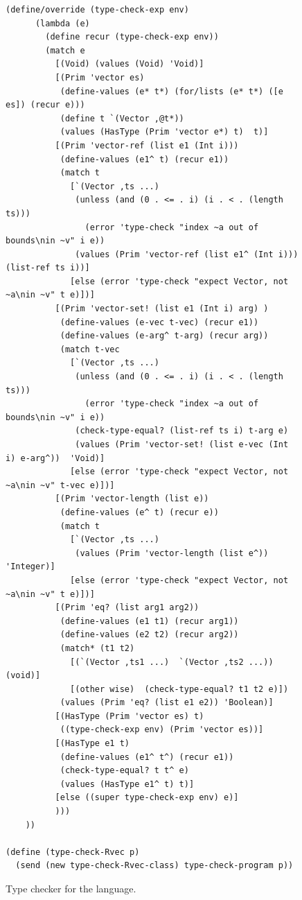 \documentclass[11pt]{book}
\begin{document}
{\begin{figure}[tp]
\begin{lstlisting}[basicstyle=\ttfamily\scriptsize]
    (define/override (type-check-exp env)
      (lambda (e)
        (define recur (type-check-exp env))
        (match e
          [(Void) (values (Void) 'Void)]
          [(Prim 'vector es)
           (define-values (e* t*) (for/lists (e* t*) ([e es]) (recur e)))
           (define t `(Vector ,@t*))
           (values (HasType (Prim 'vector e*) t)  t)]
          [(Prim 'vector-ref (list e1 (Int i)))
           (define-values (e1^ t) (recur e1))
           (match t
             [`(Vector ,ts ...)
              (unless (and (0 . <= . i) (i . < . (length ts)))
                (error 'type-check "index ~a out of bounds\nin ~v" i e))
              (values (Prim 'vector-ref (list e1^ (Int i)))  (list-ref ts i))]
             [else (error 'type-check "expect Vector, not ~a\nin ~v" t e)])]
          [(Prim 'vector-set! (list e1 (Int i) arg) )
           (define-values (e-vec t-vec) (recur e1))
           (define-values (e-arg^ t-arg) (recur arg))
           (match t-vec
             [`(Vector ,ts ...)
              (unless (and (0 . <= . i) (i . < . (length ts)))
                (error 'type-check "index ~a out of bounds\nin ~v" i e))
              (check-type-equal? (list-ref ts i) t-arg e)
              (values (Prim 'vector-set! (list e-vec (Int i) e-arg^))  'Void)]
             [else (error 'type-check "expect Vector, not ~a\nin ~v" t-vec e)])]
          [(Prim 'vector-length (list e))
           (define-values (e^ t) (recur e))
           (match t
             [`(Vector ,ts ...)
              (values (Prim 'vector-length (list e^))  'Integer)]
             [else (error 'type-check "expect Vector, not ~a\nin ~v" t e)])]
          [(Prim 'eq? (list arg1 arg2))
           (define-values (e1 t1) (recur arg1))
           (define-values (e2 t2) (recur arg2))
           (match* (t1 t2)
             [(`(Vector ,ts1 ...)  `(Vector ,ts2 ...))  (void)]
             [(other wise)  (check-type-equal? t1 t2 e)])
           (values (Prim 'eq? (list e1 e2)) 'Boolean)]
          [(HasType (Prim 'vector es) t)
           ((type-check-exp env) (Prim 'vector es))]
          [(HasType e1 t)
           (define-values (e1^ t^) (recur e1))
           (check-type-equal? t t^ e)
           (values (HasType e1^ t) t)]
          [else ((super type-check-exp env) e)]
          )))
    ))

(define (type-check-Rvec p)
  (send (new type-check-Rvec-class) type-check-program p))
\end{lstlisting}
\caption{Type checker for the \LangVec{} language.}
\label{fig:type-check-Rvec}
\end{figure}


}
\end{document}
